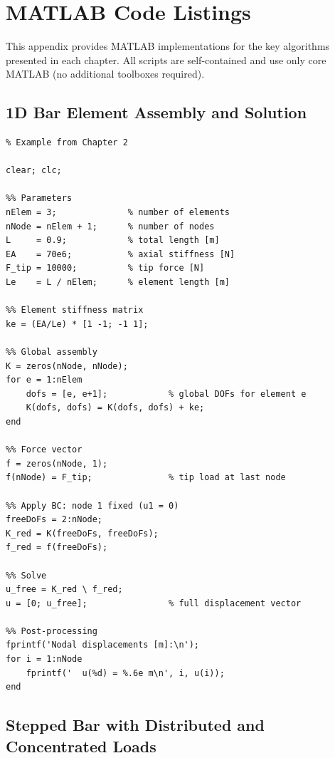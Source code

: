 \chapter{MATLAB Code Listings}
\label{app:matlab}

This appendix provides MATLAB implementations for the key algorithms
presented in each chapter. All scripts are self-contained and use only
core MATLAB (no additional toolboxes required).

\section{1D Bar Element Assembly and Solution}
\label{lst:bar1d}

\begin{lstlisting}[caption={Three-element bar under tip load (Chapter~\ref{ch:1d})},
                   label={code:bar1d}]
% fem_bar_1d.m -- 3-element 1D bar, tip load
% Example from Chapter 2

clear; clc;

%% Parameters
nElem = 3;              % number of elements
nNode = nElem + 1;      % number of nodes
L     = 0.9;            % total length [m]
EA    = 70e6;           % axial stiffness [N]
F_tip = 10000;          % tip force [N]
Le    = L / nElem;      % element length [m]

%% Element stiffness matrix
ke = (EA/Le) * [1 -1; -1 1];

%% Global assembly
K = zeros(nNode, nNode);
for e = 1:nElem
    dofs = [e, e+1];            % global DOFs for element e
    K(dofs, dofs) = K(dofs, dofs) + ke;
end

%% Force vector
f = zeros(nNode, 1);
f(nNode) = F_tip;               % tip load at last node

%% Apply BC: node 1 fixed (u1 = 0)
freeDoFs = 2:nNode;
K_red = K(freeDoFs, freeDoFs);
f_red = f(freeDoFs);

%% Solve
u_free = K_red \ f_red;
u = [0; u_free];                % full displacement vector

%% Post-processing
fprintf('Nodal displacements [m]:\n');
for i = 1:nNode
    fprintf('  u(%d) = %.6e m\n', i, u(i));
end
\end{lstlisting}

\section{Stepped Bar with Distributed and Concentrated Loads}
\label{lst:stepped_bar}


